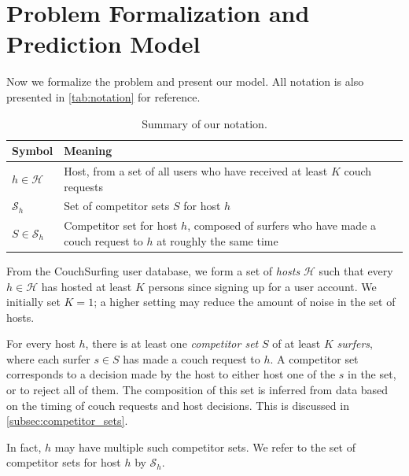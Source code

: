 \section{Problem Formalization and Prediction Model} \label{sec:model}

Now we formalize the problem and present our model.
All notation is also presented in \autoref{tab:notation} for reference.

\begin{table}
\centering
\caption{Summary of our notation.}
\label{tab:notation}
\begin{tabular}{lp{7cm}}
Symbol & Meaning\\
\hline
$h \in \mathcal{H}$   & Host, from a set of all users who have received at least $K$ couch requests\\ 
$\mathcal{S}_h$       & Set of competitor sets $S$ for host $h$\\
$S \in \mathcal{S}_h$ & Competitor set for host $h$, composed of surfers who have made a couch request to $h$ at roughly the same time \\
\hline
\end{tabular}\end{table}

From the CouchSurfing user database, we form a set of \emph{hosts} $\mathcal{H}$ such that every $h \in \mathcal{H}$ has hosted at least $K$ persons since signing up for a user account.
We initially set $K=1$; a higher setting may reduce the amount of noise in the set of hosts.

For every host $h$, there is at least one \emph{competitor set} $S$ of at least $K$ \emph{surfers}, where each surfer $s \in S$ has made a couch request to $h$.
A competitor set corresponds to a decision made by the host to either host one of the $s$ in the set, or to reject all of them.
The composition of this set is inferred from data based on the timing of couch requests and host decisions.
This is discussed in \autoref{subsec:competitor_sets}.

In fact, $h$ may have multiple such competitor sets.
We refer to the set of competitor sets for host $h$ by $\mathcal{S}_h$.



